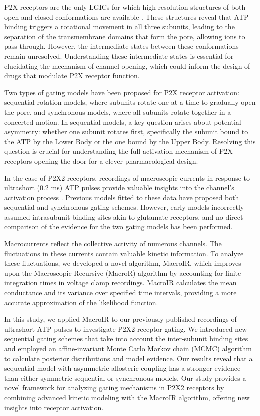\documentclass[pdflatex,sn-mathphys-num]{sn-jnl}%
\theoremstyle{thmstyleone}%
\theoremstyle{thmstyletwo}%
\theoremstyle{thmstylethree}%
\begin{document}
P2X receptors are the only LGICs for which high-resolution structures of both open and closed conformations are available \cite{cerrada_p2x,abierta_p2x}. These structures reveal that ATP binding triggers a rotational movement in all three subunits, leading to the separation of the transmembrane domains that form the pore, allowing ions to pass through. However, the intermediate states between these conformations remain unresolved. Understanding these intermediate states is essential for elucidating the mechanism of channel opening, which could inform the design of drugs that modulate P2X receptor function.

Two types of gating models have been proposed for P2X receptor activation: sequential rotation models, where subunits rotate one at a time to gradually open the pore, and synchronous models, where all subunits rotate together in a concerted motion. In sequential models, a key question arises about potential asymmetry: whether one subunit rotates first, specifically the subunit bound to the ATP by the Lower Body or the one bound by the Upper Body. Resolving this question is crucial for understanding the full activation mechanism of P2X receptors opening the door for a clever pharmacological design. 

In the case of P2X2 receptors, recordings of macroscopic currents in response to ultrashort (0.2 ms) ATP pulses provide valuable insights into the channel's activation process \cite {Moffatt_hume}. Previous models fitted to these data have proposed both sequential and synchronous gating schemes. However, early models incorrectly assumed intrasubunit binding sites akin to glutamate receptors, and no direct comparison of the evidence for the two gating models has been performed. 

Macrocurrents reflect the collective activity of numerous channels. The fluctuations in these currents contain valuable kinetic information. To analyze these fluctuations, we developed a novel algorithm, MacroIR, which improves upon the Macroscopic Recursive (MacroR) algorithm by accounting for finite integration times in voltage clamp recordings. MacroIR calculates the mean conductance and its variance over specified time intervals, providing a more accurate approximation of the likelihood function.

In this study, we applied MacroIR to our previously published recordings of ultrashort ATP pulses to investigate P2X2 receptor gating. We introduced new sequential gating schemes that take into account the inter-subunit binding sites and employed an affine-invariant Monte Carlo Markov chain (MCMC) algorithm to calculate posterior distributions and model evidence. Our results reveal that a sequential model with asymmetric allosteric coupling has a stronger evidence than either  symmetric sequential or synchronous models. Our study provides a novel framework for analyzing gating mechanisms in P2X2 receptors by combining advanced kinetic modeling with the MacroIR algorithm, offering new insights into receptor activation.
\end{document}
